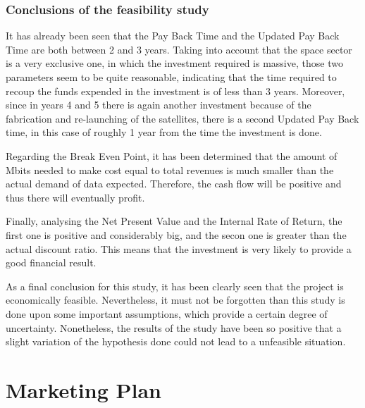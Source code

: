 \subsection{Conclusions of the feasibility study}
It has already been seen that the Pay Back Time and the Updated Pay Back Time are both between 2 and 3 years. Taking into account that the space sector is a very exclusive one, in which the investment required is massive, those two parameters seem to be quite reasonable, indicating that the time required to recoup the funds expended in the investment is of less than 3 years. Moreover, since in years 4 and 5 there is again another investment because of the fabrication and re-launching of the satellites, there is a second Updated Pay Back time, in this case of roughly 1 year from the time the investment is done.

Regarding the Break Even Point, it has been determined that the amount of Mbits needed to make cost equal to total revenues is much smaller than the actual demand of data expected. Therefore, the cash flow will be positive and thus there will eventually profit.

Finally, analysing the Net Present Value and the Internal Rate of Return, the first one is positive and considerably big, and the secon one is greater than the actual discount ratio. This means that the investment is very likely to provide a good financial result.

As a final conclusion for this study, it has been clearly seen that the project is economically feasible. Nevertheless, it must not be forgotten than this study is done upon some important assumptions, which provide a certain degree of uncertainty. Nonetheless, the results of the study have been so positive that a slight variation of the hypothesis done could not lead to a unfeasible situation. 



\chapter{Marketing Plan}
